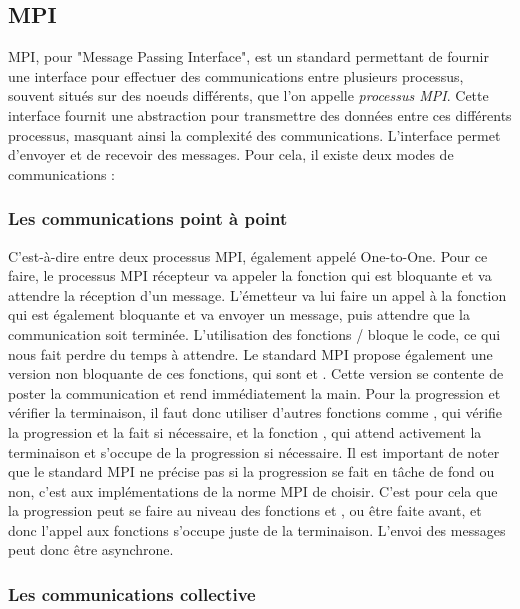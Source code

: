 \subsection{MPI}

MPI, pour "Message Passing Interface", est un standard permettant de fournir une interface pour effectuer des communications entre plusieurs processus, souvent situés sur des noeuds différents, que l'on appelle \emph{processus MPI}.
Cette interface fournit une abstraction pour transmettre des données entre ces différents processus, masquant ainsi la complexité des communications.
L'interface permet d'envoyer et de recevoir des messages. Pour cela, il existe deux modes de communications :

\subsubsection{Les communications point à point}

C'est-à-dire entre deux processus MPI, également appelé One-to-One.
Pour ce faire, le processus MPI récepteur va appeler la fonction  qui est bloquante et va attendre la réception d'un message.
L'émetteur va lui faire un appel à la fonction  qui est également bloquante et va envoyer un message, puis attendre que la communication soit terminée.
L'utilisation des fonctions  /  bloque le code, ce qui nous fait perdre du temps à attendre.
Le standard MPI propose également une version non bloquante de ces fonctions, qui sont  et .
Cette version se contente de poster la communication et rend immédiatement la main.
Pour la progression et vérifier la terminaison, il faut donc utiliser d'autres fonctions comme , qui vérifie la progression et la fait si nécessaire, et la fonction , qui attend activement la terminaison et s'occupe de la progression si nécessaire.
Il est important de noter que le standard MPI ne précise pas si la progression se fait en tâche de fond ou non, c'est aux implémentations de la norme MPI de choisir.
C'est pour cela que la progression peut se faire au niveau des fonctions  et , ou être faite avant, et donc l'appel aux fonctions s'occupe juste de la terminaison.
L'envoi des messages peut donc être asynchrone. %

\subsubsection{Les communications collective}

